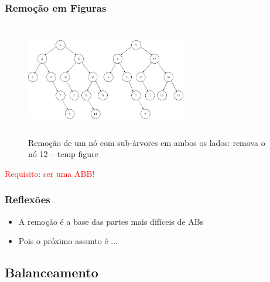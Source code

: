 \begin{frame}

\frametitle{Remoção em Figuras}

   \begin{figure}[!ht]
    \centering
    \includegraphics[width=7cm, height=5cm]{figs/fig_arvores/remove2_arvore.jpg}
    \caption{Remoção de um nó com sub-árvores em ambos os lados: remova o nó 12 -- temp figure}
    \end{figure}

\begin{flushleft}
\textcolor{red}{Requisito: ser uma ABB!}
\end{flushleft}


\end{frame}



\begin{frame}

\frametitle{Reflexões}

\begin{block}{}
\begin{itemize}
  \item A remoção é a base das partes mais difíceis de ABs
  \item Pois o próximo assunto é ...
\end{itemize}
\end{block}

\end{frame}






\subsection{Balanceamento}


